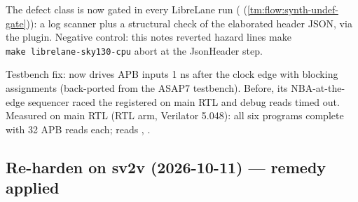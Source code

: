 \begin{record}

The defect class is now gated in every  LibreLane run
( (\cref{tm:flow:synth-undef-gate})): a log scanner plus a structural check
of the elaborated header JSON, via the
 plugin. Negative
control: this note\textquotesingle s reverted 
hazard lines make
\texttt{make\ librelane-\allowbreak{}sky130-\allowbreak{}cpu} abort at
the JsonHeader step.

Testbench fix:  now
drives APB inputs 1 ns after the clock edge with blocking assignments
(back-ported from the ASAP7 testbench). Before, its NBA-at-the-edge
sequencer raced the registered  on main RTL and debug reads
timed out. Measured on main RTL (RTL arm, Verilator 5.048): all six
programs complete with 32 APB reads each;  reads
, .

\end{record}

\subsection{Re-harden on sv2v (2026-10-11) --- remedy applied}\label{cr:defect:sky130-cpu-synlig-dud4:re-harden-on-sv2v-2026-10-11-remedy-applied}

